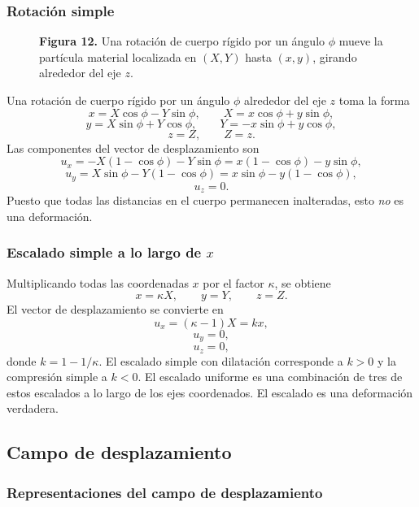 \subsubsection{Rotación simple}

\begin{figure}[H]
\centering

\par\medskip
\textbf{Figura 12.} Una rotación de cuerpo rígido por un ángulo $\phi$ mueve la partícula material localizada en $(X, Y)$ hasta $(x, y)$, girando alrededor del eje $z$.
\end{figure}

Una rotación de cuerpo rígido por un ángulo $\phi$ alrededor del eje $z$ toma la forma
\[ x = X\cos\phi - Y\sin\phi, \qquad X = x\cos\phi + y\sin\phi, \tag{74} \]
\[ y = X\sin\phi + Y\cos\phi, \qquad Y = -x\sin\phi + y\cos\phi, \tag{75} \]
\[ z = Z, \qquad Z = z. \tag{76} \]
Las componentes del vector de desplazamiento son
\[ u_x = -X(1 - \cos\phi) - Y\sin\phi = x(1 - \cos\phi) - y\sin\phi, \tag{77} \]
\[ u_y = X\sin\phi - Y(1 - \cos\phi) = x\sin\phi - y(1 - \cos\phi), \tag{78} \]
\[ u_z = 0. \tag{79} \]
Puesto que todas las distancias en el cuerpo permanecen inalteradas, esto \emph{no} es una deformación.

\subsubsection{Escalado simple a lo largo de $x$}

Multiplicando todas las coordenadas $x$ por el factor $\kappa$, se obtiene
\[ x = \kappa X, \qquad y = Y, \qquad z = Z. \tag{80} \]
El vector de desplazamiento se convierte en
\[ u_x = (\kappa - 1)X = kx, \tag{81} \]
\[ u_y = 0, \tag{82} \]
\[ u_z = 0, \tag{83} \]
donde $k = 1 - 1/\kappa$. El escalado simple con dilatación corresponde a $k > 0$ y la compresión simple a $k < 0$. El escalado uniforme es una combinación de tres de estos escalados a lo largo de los ejes coordenados. El escalado es una deformación verdadera.

\subsection{Campo de desplazamiento}

\subsubsection{Representaciones del campo de desplazamiento}

